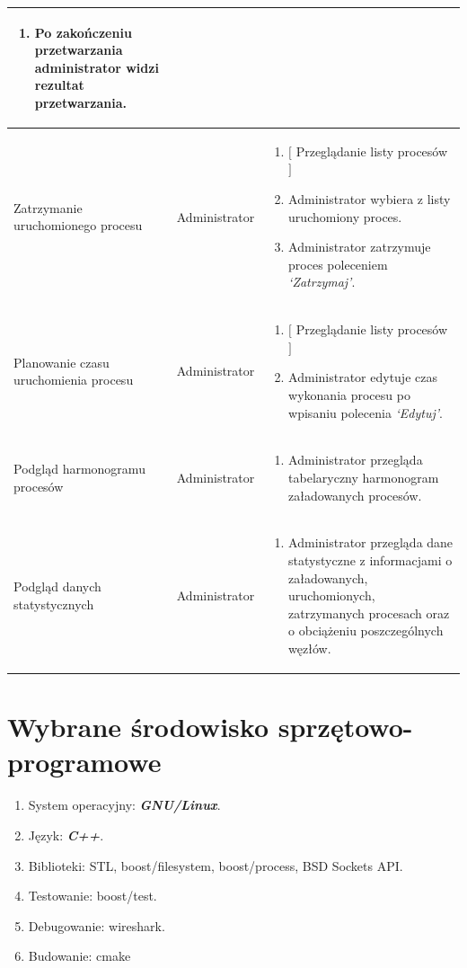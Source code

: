 \documentclass[paper=a4, fontsize=11pt]{scrartcl} %
\begin{document}
\begin{longtable}{ |m{4.5cm}|m{3cm}|m{7.5cm}|}
\begin{enumerate}
\item Po zakończeniu przetwarzania administrator widzi rezultat przetwarzania.
\end{enumerate} \\
 \hline
Zatrzymanie uruchomionego procesu & Administrator & 
\begin{enumerate}
\item $[$ Przeglądanie listy procesów $]$
\item Administrator wybiera z listy uruchomiony proces.
\item Administrator zatrzymuje proces poleceniem \textit{‘Zatrzymaj’}.
\end{enumerate} \\
 \hline
Planowanie czasu uruchomienia procesu & Administrator & 
\begin{enumerate}
\item $[$ Przeglądanie listy procesów $]$
\item Administrator edytuje czas wykonania procesu po wpisaniu polecenia \textit{‘Edytuj’}.
\end{enumerate} \\
 \hline
Podgląd harmonogramu procesów & Administrator & 
\begin{enumerate}
\item Administrator przegląda tabelaryczny harmonogram załadowanych procesów.
\end{enumerate} \\
 \hline
Podgląd danych statystycznych & Administrator & 
\begin{enumerate}
\item Administrator przegląda dane statystyczne z informacjami o załadowanych, uruchomionych, zatrzymanych procesach oraz o obciążeniu poszczególnych węzłów.
\end{enumerate} \\
 \hline
\end{longtable}

\section*{Wybrane środowisko sprzętowo-programowe} 
\begin{enumerate}
\item System operacyjny: \textit{\textbf{GNU/Linux}}.
\item Język: \textit{\textbf{C++}}.
\item Biblioteki: STL, boost/filesystem, boost/process, BSD Sockets API.
\item Testowanie: boost/test.
\item Debugowanie: wireshark.
\item Budowanie: cmake
\end{enumerate}
\end{document}
